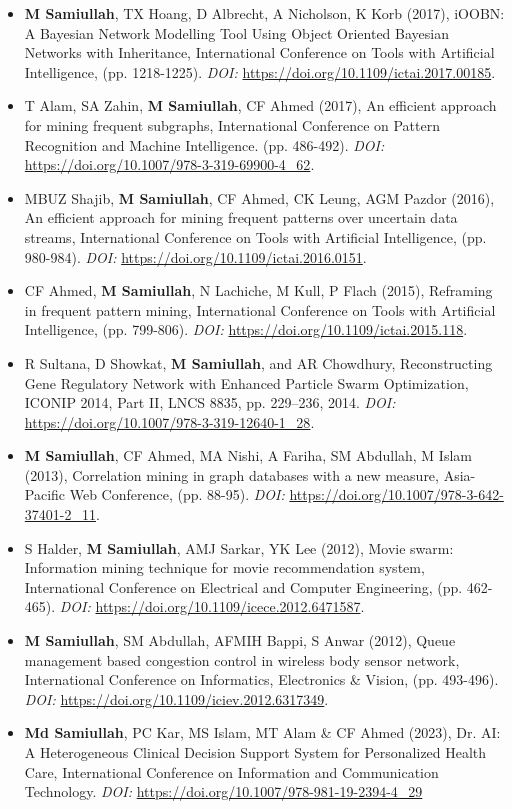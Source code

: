 \documentclass{my_cv}
\begin{document}
\begin{itemize}[noitemsep]
    \item \textbf{M Samiullah}, TX Hoang, D Albrecht, A Nicholson, K Korb (2017), iOOBN: A Bayesian Network Modelling Tool Using Object Oriented Bayesian Networks with Inheritance, International Conference on Tools with Artificial Intelligence, (pp. 1218-1225). {\em DOI:} \url{https://doi.org/10.1109/ictai.2017.00185}.
    \item T Alam, SA Zahin, {\bf M Samiullah}, CF Ahmed (2017), An efficient approach for mining frequent subgraphs, International Conference on Pattern Recognition and Machine Intelligence. (pp. 486-492). {\em DOI:} \url{https://doi.org/10.1007/978-3-319-69900-4_62}.
    \item MBUZ Shajib, {\bf M Samiullah}, CF Ahmed, CK Leung, AGM Pazdor (2016), An efficient approach for mining frequent patterns over uncertain data streams, International Conference on Tools with Artificial Intelligence, (pp. 980-984). {\em DOI:} \url{https://doi.org/10.1109/ictai.2016.0151}.
    \item CF Ahmed, {\bf M Samiullah}, N Lachiche, M Kull, P Flach (2015), Reframing in frequent pattern mining, International Conference on Tools with Artificial Intelligence, (pp. 799-806). {\em DOI:} \url{https://doi.org/10.1109/ictai.2015.118}.
    \item R Sultana, D Showkat, \textbf{M Samiullah}, and AR Chowdhury, Reconstructing Gene Regulatory Network with Enhanced Particle Swarm Optimization, ICONIP 2014, Part II, LNCS 8835, pp. 229–236, 2014. {\em DOI:} \url{https://doi.org/10.1007/978-3-319-12640-1_28}.
    \item {\bf M Samiullah}, CF Ahmed, MA Nishi, A Fariha, SM Abdullah, M Islam (2013), Correlation mining in graph databases with a new measure, Asia-Pacific Web Conference, (pp. 88-95). {\em DOI:} \url{https://doi.org/10.1007/978-3-642-37401-2_11}.
    \item S Halder, {\bf M Samiullah}, AMJ Sarkar, YK Lee (2012), Movie swarm: Information mining technique for movie recommendation system, International Conference on Electrical and Computer Engineering, (pp. 462-465). {\em DOI:} \url{https://doi.org/10.1109/icece.2012.6471587}.
    \item {\bf M Samiullah}, SM Abdullah, AFMIH Bappi, S Anwar (2012), Queue management based congestion control in wireless body sensor network, International Conference on Informatics, Electronics \& Vision, (pp. 493-496). {\em DOI:} \url{https://doi.org/10.1109/iciev.2012.6317349}.
    \item {\bf Md Samiullah}, PC Kar, MS Islam, MT Alam \& CF Ahmed (2023), Dr. AI: A Heterogeneous Clinical Decision Support System for Personalized Health Care, International Conference on Information and Communication Technology. {\em DOI:} \url{https://doi.org/10.1007/978-981-19-2394-4_29}
\end{itemize}
\end{document}
